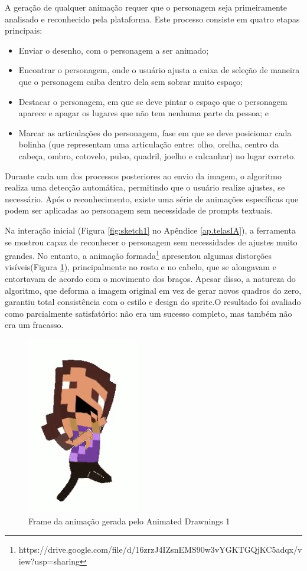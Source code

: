 A geração de qualquer animação requer que o personagem seja primeiramente analisado e reconhecido pela plataforma. Este processo consiste em quatro etapas principais: 

\begin{itemize}
    \item Enviar o desenho, com o personagem a ser animado;
    \item Encontrar o personagem, onde o usuário ajusta a caixa de seleção de maneira que o personagem caiba dentro dela sem sobrar muito espaço;
    \item Destacar o personagem, em que se deve pintar o espaço que o personagem aparece e apagar os lugares que não tem nenhuma parte da pessoa; e
    \item Marcar as articulações do personagem, fase em que se deve posicionar cada bolinha (que representam uma articulação entre: olho, orelha, centro da cabeça, ombro, cotovelo, pulso, quadril, joelho e calcanhar) no lugar correto. 
\end{itemize}

Durante cada um dos processos posteriores ao envio da imagem, o algoritmo realiza uma detecção automática, permitindo que o usuário realize ajustes, se necessário. Após o reconhecimento, existe uma série de animações específicas que podem ser aplicadas ao personagem sem necessidade de prompts textuais.

Na interação inicial (Figura \ref{fig:sketch1} no Apêndice \ref{ap.telasIA}), a ferramenta se mostrou capaz de reconhecer o personagem sem necessidades de ajustes muito grandes. No entanto, a animação formada\footnote{https://drive.google.com/file/d/16zrzJ4IZsnEMS90w3vYGKTGQjKC5adqx/view?usp=sharing} apresentou algumas distorções visíveis(Figura \ref{fig:sketchIrma1Frame}), principalmente no rosto e no cabelo, que se alongavam e entortavam de acordo com o movimento dos braços. Apesar disso, a natureza do algoritmo, que deforma a imagem original em vez de gerar novos quadros do zero, garantiu total consistência com o estilo e design do sprite.O resultado foi avaliado como parcialmente satisfatório: não era um sucesso completo, mas também não era um fracasso.

\begin{figure}[htbp]
    \centering
    \caption{\small Frame da animação gerada pelo Animated Drawnings 1}
    \label{fig:sketchIrma1Frame}
    \includegraphics[width=0.3\linewidth]{figs/sketchLab/irma1_frame1_andando.PNG}
\end{figure}

